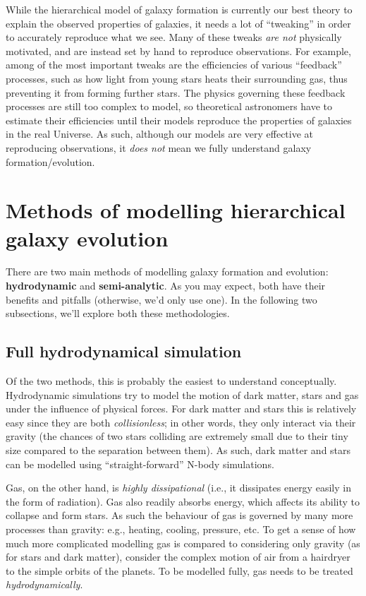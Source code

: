 \documentclass[11pt]{article}
\begin{document}
While the hierarchical model of galaxy formation is currently our best
theory to explain the observed properties of galaxies, it needs a lot
of ``tweaking'' in order to accurately reproduce what we see. Many of
these tweaks {\it are not} physically motivated, and are instead set
by hand to reproduce observations. For example, among of the most
important tweaks are the efficiencies of various ``feedback''
processes, such as how light from young stars heats their surrounding
gas, thus preventing it from forming further stars. The physics
governing these feedback processes are still too complex to model, so
theoretical astronomers have to estimate their efficiencies until
their models reproduce the properties of galaxies in the real
Universe. As such, although our models are very effective at
reproducing observations, it {\it does not} mean we fully understand
galaxy formation/evolution.

\section{Methods of modelling hierarchical galaxy evolution}
There are two main methods of modelling galaxy formation and
evolution: {\bf hydrodynamic} and {\bf semi-analytic}. As you may
expect, both have their benefits and pitfalls (otherwise, we'd only
use one). In the following two subsections, we'll explore both these
methodologies.

\subsection{Full hydrodynamical simulation}
Of the two methods, this is probably the easiest to understand
conceptually. Hydrodynamic simulations try to model the motion of dark
matter, stars and gas under the influence of physical forces. For dark
matter and stars this is relatively easy since they are both {\it
  collisionless}; in other words, they only interact via their gravity
(the chances of two stars colliding are extremely small due to their
tiny size compared to the separation between them). As such, dark
matter and stars can be modelled using ``straight-forward'' N-body
simulations.

Gas, on the other hand, is {\it highly dissipational} (i.e., it
dissipates energy easily in the form of radiation). Gas also readily
absorbs energy, which affects its ability to collapse and form
stars. As such the behaviour of gas is governed by many more processes
than gravity: e.g., heating, cooling, pressure, etc. To get a sense of
how much more complicated modelling gas is compared to considering
only gravity (as for stars and dark matter), consider the complex
motion of air from a hairdryer to the simple orbits of the planets. To
be modelled fully, gas needs to be treated {\it hydrodynamically}.
\end{document}
